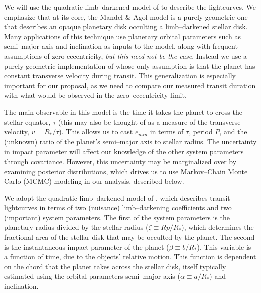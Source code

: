 We will use the quadratic limb--darkened model
of \cite{2002ApJ...580L.171M} to describe the lightcurves.  We
emphasize that at its core, the Mandel \& Agol model is a purely
geometric one that describes an opaque planetary disk occulting a
limb--darkened stellar disk.  Many applications of this technique use
planetary orbital parameters such as semi--major axis and inclination
as inputs to the model, along with frequent assumptions of zero
eccentricity, {\it but this need not be the case}.  Instead we use a
purely geometric implementation of \cite{2002ApJ...580L.171M} whose
only assumption is that the planet has constant transverse velocity
during transit.  This generalization is especially important for our
proposal, as we need to compare our measured transit duration with
what would be observed in the zero--eccentricity limit.

The main observable in this model is the time it takes the planet to
cross the stellar equator, $\tau$ (this may also be thought of as a
measure of the transverse velocity, $v = R_*/\tau$).  This allows us
to cast $e_{min}$ in terms of $\tau$, period $P$, and the (unknown)
ratio of the planet's semi--major axis to stellar radius.  The
uncertainty in impact parameter will affect our knowledge of the other
system parameters through covariance.  However, this uncertainty may
be marginalized over by examining posterior distributions, which
drives us to use Markov--Chain Monte Carlo (MCMC) modeling in our
analysis, described below.


\medskip
{\centerline{}}
\smallskip


We adopt the quadratic limb--darkened model
of \cite{2002ApJ...580L.171M}, which describes transit lightcurves in
terms of two (nuisance) limb--darkening coefficients and two
(important) system parameters.  The first of the system parameters is
the planetary radius divided by the stellar radius ($\zeta \equiv
Rp/R_*$), which determines the fractional area of the stellar disk
that may be occulted by the planet.  The second is the instantaneous impact
parameter of the planet ($\beta \equiv b/R_*$).  This variable is a
function of time, due to the objects' relative motion.  This function
is dependent on the chord that the planet takes across the stellar
disk, itself typically estimated using the orbital parameters
semi--major axis ($\alpha \equiv a/R_*$) and inclination.

